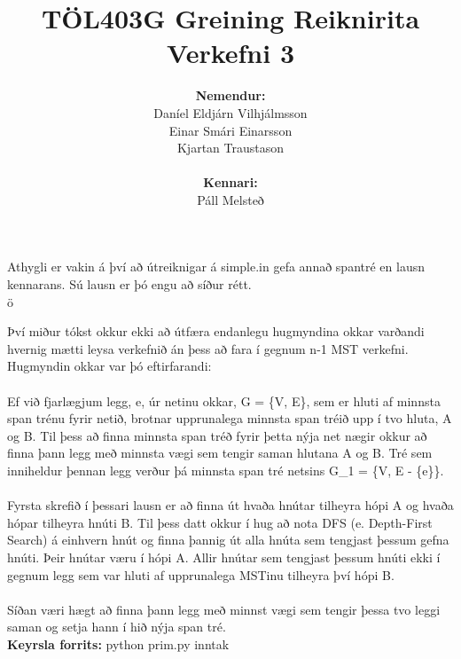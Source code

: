 \documentclass[a4paper]{article}
\begin{document}
\title{
  TÖL403G Greining Reiknirita \\
  Verkefni 3 }

\author{
\textbf{Nemendur:}\\
  Daníel Eldjárn Vilhjálmsson \\
  Einar Smári Einarsson       \\
  Kjartan Traustason \\ \\
\textbf{Kennari:}\\
Páll Melsteð
}

\maketitle
Athygli er vakin á því að útreiknigar á simple.in gefa annað spantré en lausn kennarans. Sú lausn er þó engu að síður rétt.\\ ö\

Því miður tókst okkur ekki að útfæra endanlegu hugmyndina okkar varðandi hvernig mætti leysa verkefnið án þess að fara í gegnum n-1 MST verkefni. Hugmyndin okkar var þó eftirfarandi:\\ \\

Ef við fjarlægjum legg, e, úr netinu okkar, G = \{V, E\},  sem er hluti af minnsta span trénu fyrir netið, brotnar upprunalega minnsta span tréið upp í tvo hluta, A og B. Til þess að finna minnsta span tréð fyrir þetta nýja net nægir okkur að finna þann legg með minnsta vægi sem tengir saman hlutana A og B. Tré sem inniheldur þennan legg verður þá minnsta span tré netsins G\_1 = \{V, E - \{e\}\}. \\ \\

Fyrsta skrefið í þessari lausn er að finna út hvaða hnútar tilheyra hópi A og hvaða hópar tilheyra hnúti B. Til þess datt okkur í hug að nota DFS (e. Depth-First Search) á einhvern hnút og finna þannig út alla hnúta sem tengjast þessum gefna hnúti. Þeir hnútar væru í hópi A. Allir hnútar sem tengjast þessum hnúti ekki í gegnum legg sem var hluti af upprunalega MSTinu tilheyra því hópi B.\\ \\

Síðan væri hægt að finna þann legg með minnst vægi sem tengir þessa tvo leggi saman og setja hann í hið nýja span tré. \\

\textbf{Keyrsla forrits:} python prim.py inntak
\end{document}
